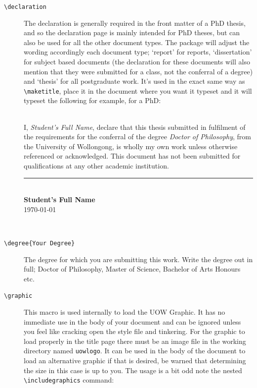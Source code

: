 \documentclass[12pt,oneside]{article}
\newcommand{\command}[1]{\texttt{\color{UOWred}#1}}
\newcommand{\comoptions}[1]{\texttt{\color{UOWdarkblue}#1}}
\begin{document}
\begin{description}
    \item[\command{\textbackslash{}declaration}] The declaration is generally required in the front matter of a PhD thesis, and so the declaration page is mainly intended for PhD theses, but can also be used for all the other document types. The package will adjust the wording accordingly each document type; `report' for reports, `dissertation' for subject based documents (the declaration for these documents will also mention that they were submitted for a class, not the conferral of a degree) and `thesis' for all postgraduate work. It's used in the exact same way as \command{\textbackslash{}maketitle}, place it in the document where you want it typeset and it will typeset the following for example, for a PhD:\\
    
\\

{\noindent I, \emph{Student's Full Name}, declare that this thesis submitted in fulfilment of the requirements for the conferral of the degree \emph{Doctor of Philosophy}, from the University of Wollongong, is wholly my own work unless otherwise referenced or acknowledged. This document has not been submitted for qualifications at any other academic institution.\par
\vspace{1cm}
\noindent\rule{0.4\textwidth}{0.5pt}
\vspace{1ex}\\
\textbf{Student's Full Name}\\
\today}\\

    \item[\command{\textbackslash{}degree}\comoptions{\{Your Degree\}}] The degree for which you are submitting this work. Write the degree out in full; Doctor of Philosophy, Master of Science, Bachelor of Arts Honours etc.
    
    \item[\command{\textbackslash{}graphic}] This macro is used internally to load the UOW Graphic. It has no immediate use in the body of your document and can be ignored unless you feel like cracking open the style file and tinkering. For the graphic to load properly in the title page there must be an image file in the working directory named \texttt{uow\textunderscore{}logo}. It can be used in the body of the document to load an alternative graphic if that is desired, be warned that determining the size in this case is up to you.
    The usage is a bit odd note the nested \command{\textbackslash{}includegraphics} command:
    

\end{description}
\end{document}
